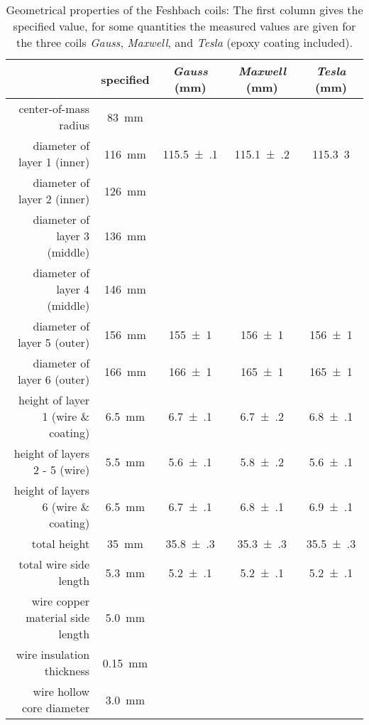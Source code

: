 \begin{table}
    \centering
    \begin{tabular}{rcccc}
        \toprule
        & \textbf{specified} & \textbf{\textit{Gauss}} (\si[]{\milli\meter}) & \textbf{\textit{Maxwell}} (\si[]{\milli\meter}) & \textbf{\textit{Tesla}} (\si[]{\milli\meter}) \\
        \toprule
        center-of-mass radius & \SI{83}{\milli\meter} &&& \\
        diameter of layer 1 (inner) & \SI{116}{\milli\meter} & \SI{115.5(1)}{}& \SI{115.1(2)}{} & \SI{115.3}{3} \\
        diameter of layer 2 (inner) & \SI{126}{\milli\meter} & && \\
        diameter of layer 3 (middle) & \SI{136}{\milli\meter} &&& \\
        diameter of layer 4 (middle) & \SI{146}{\milli\meter} &&& \\
        diameter of layer 5 (outer) & \SI{156}{\milli\meter} & \SI{155(1)}{}& \SI{156(1)}{} & \SI{156(1)}{} \\
        diameter of layer 6 (outer) & \SI{166}{\milli\meter} & \SI{166(1)}{} & \SI{165(1)}{} & \SI{165(1)}{} \\
        \midrule
        height of layer 1 (wire \& coating) & \SI{6.5}{\milli\meter} & \SI{6.7(1)}{} & \SI{6.7(2)}{} & \SI{6.8(1)}{} \\
        height of layers 2 - 5 (wire) & \SI{5.5}{\milli\meter} & \SI{5.6(1)}{} & \SI{5.8(2)}{} & \SI{5.6(1)}{} \\
        height of layers 6 (wire \& coating) & \SI{6.5}{\milli\meter} & \SI{6.7(1)}{} & \SI{6.8(1)}{} & \SI{6.9(1)}{}\\
        total height & \SI{35}{\milli\meter} & \SI{35.8(3)}{} & \SI{35.3(3)}{} & \SI{35.5(3)}{}\\
        \midrule
        total wire side length &  \SI{5.3}{\milli\meter} & \SI{5.2(1)}{} & \SI{5.2(1)}{} & \SI{5.2(1)}{}\\
        wire copper material side length & \SI{5.0}{\milli\meter} &&& \\
        wire insulation thickness & \SI{0.15}{\milli\meter} &&& \\
        wire hollow core diameter & \SI{3.0}{\milli\meter} &&& \\
        \bottomrule
    \end{tabular}
    \caption{Geometrical properties of the Feshbach coils: The first column gives the specified value, for some quantities the measured values are given for the three coils \textit{Gauss}, \textit{Maxwell}, and \textit{Tesla} (epoxy coating included).
    }
    \label{tab:coil_geometrical_properties}
\end{table}

